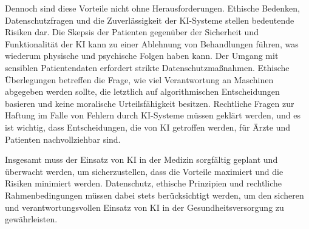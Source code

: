Dennoch sind diese Vorteile nicht ohne Herausforderungen. Ethische Bedenken, Datenschutzfragen und die Zuverlässigkeit der KI-Systeme stellen bedeutende Risiken dar. 
Die Skepsis der Patienten gegenüber der Sicherheit und Funktionalität der KI kann zu einer Ablehnung von Behandlungen führen, was wiederum physische und psychische Folgen haben kann. 
Der Umgang mit sensiblen Patientendaten erfordert strikte Datenschutzmaßnahmen.
Ethische Überlegungen betreffen die Frage, wie viel Verantwortung an Maschinen abgegeben werden sollte, die letztlich auf algorithmischen Entscheidungen basieren und keine moralische Urteilsfähigkeit besitzen. 
Rechtliche Fragen zur Haftung im Falle von Fehlern durch KI-Systeme müssen geklärt werden, und es ist wichtig, dass Entscheidungen, die von KI getroffen werden, für Ärzte und Patienten nachvollziehbar sind.

Insgesamt muss der Einsatz von KI in der Medizin sorgfältig geplant und überwacht werden, um sicherzustellen, dass die Vorteile maximiert und die Risiken minimiert werden. 
Datenschutz, ethische Prinzipien und rechtliche Rahmenbedingungen müssen dabei stets berücksichtigt werden, um den sicheren und verantwortungsvollen Einsatz von KI in der Gesundheitsversorgung zu gewährleisten.